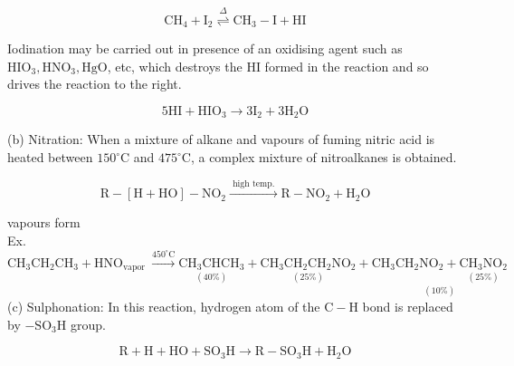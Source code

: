 \documentclass[10pt]{article}
\begin{document}
$$
\mathrm{CH}_{4}+\mathrm{I}_{2} \stackrel{\Delta}{\rightleftharpoons} \mathrm{CH}_{3}-\mathrm{I}+\mathrm{HI}
$$

Iodination may be carried out in presence of an oxidising agent such as $\mathrm{HIO}_{3}, \mathrm{HNO}_{3}, \mathrm{HgO}$, etc, which destroys the HI formed in the reaction and so drives the reaction to the right.

$$
5 \mathrm{HI}+\mathrm{HIO}_{3} \longrightarrow 3 \mathrm{I}_{2}+3 \mathrm{H}_{2} \mathrm{O}
$$

(b) Nitration: When a mixture of alkane and vapours of fuming nitric acid is heated between $150^{\circ} \mathrm{C}$ and $475^{\circ} \mathrm{C}$, a complex mixture of nitroalkanes is obtained.

$$
\mathrm{R}-[\mathrm{H}+\mathrm{HO}]-\mathrm{NO}_{2} \xrightarrow{\text { high temp. }} \mathrm{R}-\mathrm{NO}_{2}+\mathrm{H}_{2} \mathrm{O}
$$

vapours form\\
Ex. $\mathrm{CH}_{3} \mathrm{CH}_{2} \mathrm{CH}_{3}+\mathrm{HNO}_{\text {vapor }} \xrightarrow{450^{\circ} \mathrm{C}} \underset{(40 \%)}{\mathrm{CH}_{3} \mathrm{CHCH}_{3}}+\underset{(25 \%)}{\mathrm{CH}_{3} \mathrm{CH}_{2} \mathrm{CH}_{2} \mathrm{NO}_{2}}+\underset{(10 \%)}{\mathrm{CH}_{3} \mathrm{CH}_{2} \mathrm{NO}_{2}+\underset{(25 \%)}{\mathrm{CH}_{3} \mathrm{NO}_{2}}}$\\
(c) Sulphonation: In this reaction, hydrogen atom of the $\mathrm{C}-\mathrm{H}$ bond is replaced by $-\mathrm{SO}_{3} \mathrm{H}$ group.

$$
\mathrm{R}+\mathrm{H}+\mathrm{HO}+\mathrm{SO}_{3} \mathrm{H} \longrightarrow \mathrm{R}-\mathrm{SO}_{3} \mathrm{H}+\mathrm{H}_{2} \mathrm{O}
$$
\end{document}
